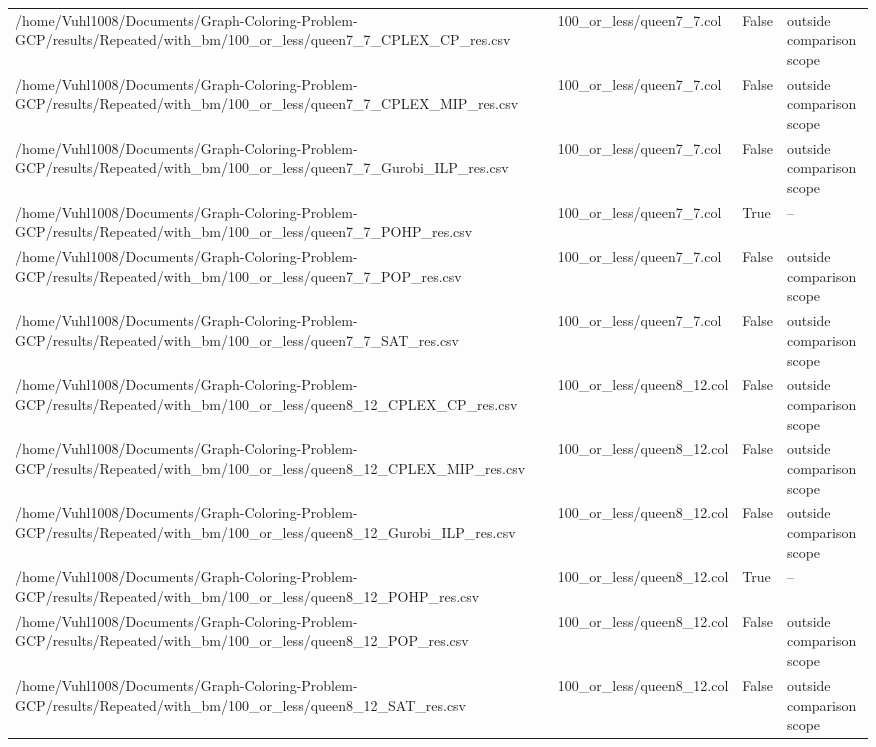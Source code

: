 \begin{table}[htbp]
\begin{tabular}{llll}
/home/Vuhl1008/Documents/Graph-Coloring-Problem-GCP/results/Repeated/with\_bm/100\_or\_less/queen7\_7\_CPLEX\_CP\_res.csv & 100\_or\_less/queen7\_7.col & False & outside comparison scope \\
/home/Vuhl1008/Documents/Graph-Coloring-Problem-GCP/results/Repeated/with\_bm/100\_or\_less/queen7\_7\_CPLEX\_MIP\_res.csv & 100\_or\_less/queen7\_7.col & False & outside comparison scope \\
/home/Vuhl1008/Documents/Graph-Coloring-Problem-GCP/results/Repeated/with\_bm/100\_or\_less/queen7\_7\_Gurobi\_ILP\_res.csv & 100\_or\_less/queen7\_7.col & False & outside comparison scope \\
/home/Vuhl1008/Documents/Graph-Coloring-Problem-GCP/results/Repeated/with\_bm/100\_or\_less/queen7\_7\_POHP\_res.csv & 100\_or\_less/queen7\_7.col & True & -- \\
/home/Vuhl1008/Documents/Graph-Coloring-Problem-GCP/results/Repeated/with\_bm/100\_or\_less/queen7\_7\_POP\_res.csv & 100\_or\_less/queen7\_7.col & False & outside comparison scope \\
/home/Vuhl1008/Documents/Graph-Coloring-Problem-GCP/results/Repeated/with\_bm/100\_or\_less/queen7\_7\_SAT\_res.csv & 100\_or\_less/queen7\_7.col & False & outside comparison scope \\
/home/Vuhl1008/Documents/Graph-Coloring-Problem-GCP/results/Repeated/with\_bm/100\_or\_less/queen8\_12\_CPLEX\_CP\_res.csv & 100\_or\_less/queen8\_12.col & False & outside comparison scope \\
/home/Vuhl1008/Documents/Graph-Coloring-Problem-GCP/results/Repeated/with\_bm/100\_or\_less/queen8\_12\_CPLEX\_MIP\_res.csv & 100\_or\_less/queen8\_12.col & False & outside comparison scope \\
/home/Vuhl1008/Documents/Graph-Coloring-Problem-GCP/results/Repeated/with\_bm/100\_or\_less/queen8\_12\_Gurobi\_ILP\_res.csv & 100\_or\_less/queen8\_12.col & False & outside comparison scope \\
/home/Vuhl1008/Documents/Graph-Coloring-Problem-GCP/results/Repeated/with\_bm/100\_or\_less/queen8\_12\_POHP\_res.csv & 100\_or\_less/queen8\_12.col & True & -- \\
/home/Vuhl1008/Documents/Graph-Coloring-Problem-GCP/results/Repeated/with\_bm/100\_or\_less/queen8\_12\_POP\_res.csv & 100\_or\_less/queen8\_12.col & False & outside comparison scope \\
/home/Vuhl1008/Documents/Graph-Coloring-Problem-GCP/results/Repeated/with\_bm/100\_or\_less/queen8\_12\_SAT\_res.csv & 100\_or\_less/queen8\_12.col & False & outside comparison scope \\

\end{tabular}
\end{table}
